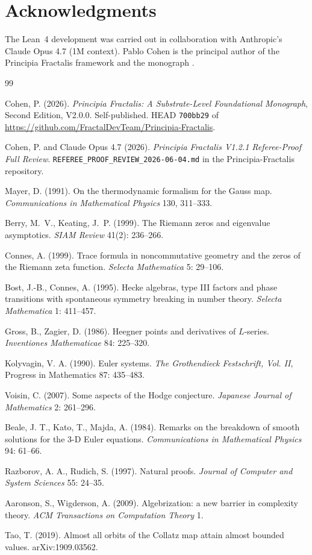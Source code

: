 \documentclass[11pt,a4paper]{article}
\theoremstyle{plain}
\theoremstyle{definition}
\begin{document}
\section*{Acknowledgments}

The Lean~4 development was carried out in collaboration with
Anthropic's Claude Opus 4.7 (1M context). Pablo Cohen is the
principal author of the Principia Fractalis framework and the
monograph \cite{principia_book_v2}.

\begin{thebibliography}{99}

Cohen, P. (2026). \emph{Principia Fractalis: A Substrate-Level
Foundational Monograph}, Second Edition, V2.0.0. Self-published.
HEAD \texttt{700bb29} of
\url{https://github.com/FractalDevTeam/Principia-Fractalis}.

Cohen, P. and Claude Opus 4.7 (2026). \emph{Principia Fractalis
V1.2.1 Referee-Proof Full Review}.
\texttt{REFEREE\_PROOF\_REVIEW\_2026-06-04.md} in the
Principia-Fractalis repository.

Mayer, D. (1991). On the thermodynamic formalism for the
Gauss map. \emph{Communications in Mathematical Physics}
130, 311--333.

Berry, M.\ V., Keating, J.\ P. (1999). The Riemann zeros and
eigenvalue asymptotics. \emph{SIAM Review} 41(2): 236--266.

Connes, A. (1999). Trace formula in noncommutative geometry and
the zeros of the Riemann zeta function. \emph{Selecta Mathematica}
5: 29--106.

Bost, J.-B., Connes, A. (1995). Hecke algebras, type III factors
and phase transitions with spontaneous symmetry breaking in number
theory. \emph{Selecta Mathematica} 1: 411--457.

Gross, B., Zagier, D. (1986). Heegner points and derivatives of
$L$-series. \emph{Inventiones Mathematicae} 84: 225--320.

Kolyvagin, V. A. (1990). Euler systems. \emph{The Grothendieck
Festschrift, Vol. II}, Progress in Mathematics 87: 435--483.

Voisin, C. (2007). Some aspects of the Hodge conjecture.
\emph{Japanese Journal of Mathematics} 2: 261--296.

Beale, J. T., Kato, T., Majda, A. (1984). Remarks on the breakdown
of smooth solutions for the 3-D Euler equations. \emph{Communications
in Mathematical Physics} 94: 61--66.

Razborov, A. A., Rudich, S. (1997). Natural proofs. \emph{Journal of
Computer and System Sciences} 55: 24--35.

Aaronson, S., Wigderson, A. (2009). Algebrization: a new barrier in
complexity theory. \emph{ACM Transactions on Computation Theory} 1.

Tao, T. (2019). Almost all orbits of the Collatz map attain almost
bounded values. arXiv:1909.03562.

\end{thebibliography}
\end{document}
